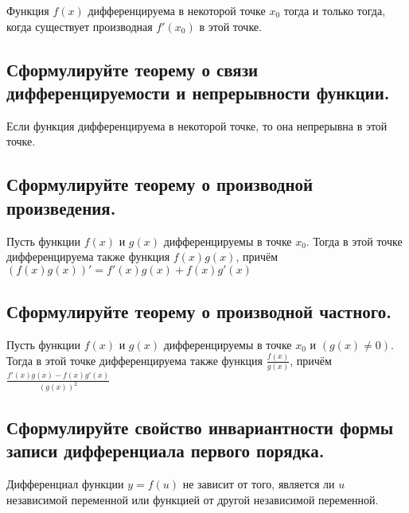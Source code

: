 Функция $f(x)$ дифференцируема в некоторой точке $x_0$ тогда и только тогда, когда существует производная $f'(x_0)$ в этой точке.


\subsection{Сформулируйте теорему о связи дифференцируемости и непрерывности функции.}

Если функция дифференцируема в некоторой точке, то она непрерывна в этой точке.


\subsection{Сформулируйте теорему о производной произведения.}

Пусть функции $f(x)$ и $g(x)$ дифференцируемы в точке $x_0$. Тогда в этой точке дифференцируема также функция $f(x)g(x)$, причём $(f(x)g(x))' = f'(x)g(x)+f(x)g'(x)$


\subsection{Сформулируйте теорему о производной частного.}

Пусть функции $f(x)$ и $g(x)$ дифференцируемы в точке $x_0$ и $(g(x) \ne 0)$. Тогда в этой точке дифференцируема также функция $\frac{f(x)}{g(x)}$, причём $\frac{f'(x)g(x)-f(x)g'(x)}{(g(x))^2}$


\subsection{Сформулируйте свойство инвариантности формы записи дифференциала первого порядка.}

Дифференциал функции $y = f(u)$ не зависит от того, является ли $u$ независимой переменной или функцией от другой независимой переменной.

